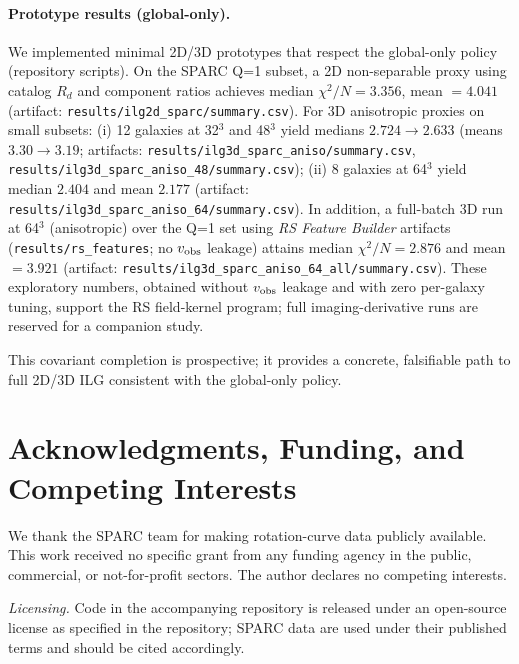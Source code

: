 \documentclass[12pt,a4paper]{article}
\begin{document}
\paragraph{Prototype results (global-only).} We implemented minimal 2D/3D prototypes that respect the global-only policy (repository scripts). On the SPARC Q=1 subset, a 2D non-separable proxy using catalog $R_d$ and component ratios achieves median $\chi^2/N=\mathbf{3.356}$, mean $=\mathbf{4.041}$ (artifact: \texttt{results/ilg2d\_sparc/summary.csv}). For 3D anisotropic proxies on small subsets: (i) 12 galaxies at 32$^3$ and 48$^3$ yield medians $\mathbf{2.724}\to\mathbf{2.633}$ (means $\mathbf{3.30}\to\mathbf{3.19}$; artifacts: \texttt{results/ilg3d\_sparc\_aniso/summary.csv}, \texttt{results/ilg3d\_sparc\_aniso\_48/summary.csv}); (ii) 8 galaxies at 64$^3$ yield median $\mathbf{2.404}$ and mean $\mathbf{2.177}$ (artifact: \texttt{results/ilg3d\_sparc\_aniso\_64/summary.csv}). In addition, a full-batch 3D run at 64$^3$ (anisotropic) over the Q=1 set using \emph{RS Feature Builder} artifacts (\texttt{results/rs\_features}; no $v_{\rm obs}$ leakage) attains median $\chi^2/N = \mathbf{2.876}$ and mean $=\mathbf{3.921}$ (artifact: \texttt{results/ilg3d\_sparc\_aniso\_64\_all/summary.csv}). These exploratory numbers, obtained without $v_{\rm obs}$ leakage and with zero per-galaxy tuning, support the RS field-kernel program; full imaging-derivative runs are reserved for a companion study.

\medskip
\noindent This covariant completion is prospective; it provides a concrete, falsifiable path to full 2D/3D ILG consistent with the global-only policy.

\section*{Acknowledgments, Funding, and Competing Interests}
\noindent We thank the SPARC team for making rotation-curve data publicly available. This work received no specific grant from any funding agency in the public, commercial, or not-for-profit sectors. The author declares no competing interests.

\noindent \textit{Licensing.} Code in the accompanying repository is released under an open-source license as specified in the repository; SPARC data are used under their published terms and should be cited accordingly.
\end{document}
